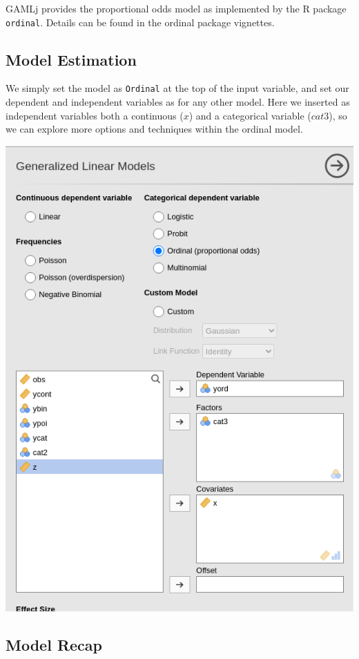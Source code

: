 \documentclass[
]{book}
\begin{document}
{GAMLj} provides the proportional odds model as implemented by the R package \texttt{ordinal}. Details can be found in the ordinal package vignettes.

\hypertarget{model-estimation-2}{%
\subsection{Model Estimation}\label{model-estimation-2}}

We simply set the model as \texttt{Ordinal} at the top of the input variable, and set our dependent and independent variables as for any other model. Here we inserted as independent variables both a continuous (\(x\)) and a categorical variable (\(cat3\)), so we can explore more options and techniques within the ordinal model.

\includegraphics[width=7.96in]{bookletpics/3_ordinal_input1}

\hypertarget{model-recap-2}{%
\subsection{Model Recap}\label{model-recap-2}}
\end{document}

